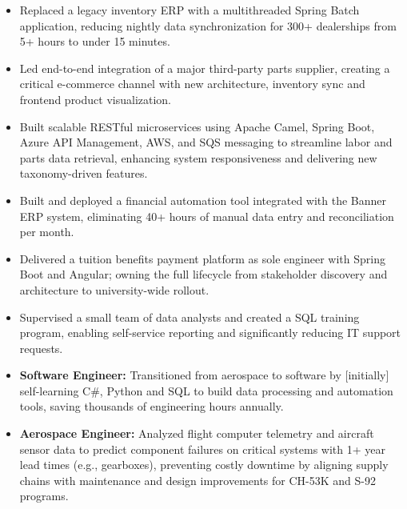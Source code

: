 \begin{itemize}[leftmargin=*, itemsep=\bulletItemSeparation, topsep=0pt]
    \item Replaced a legacy inventory ERP with a multithreaded Spring Batch application, reducing nightly data synchronization for 300+ dealerships from 5+ hours to under 15 minutes.
    \item Led end-to-end integration of a major third-party parts supplier, creating a critical e-commerce channel with new architecture, inventory sync and frontend product visualization.
    \item Built scalable RESTful microservices using Apache Camel, Spring Boot, Azure API Management, AWS, and SQS messaging to streamline labor and parts data retrieval, enhancing system responsiveness and delivering new taxonomy-driven features.
\end{itemize}
\vspace{\spacingBetweenJobs}

\begin{itemize}[leftmargin=*, itemsep=\bulletItemSeparation, topsep=0pt]
    \item Built and deployed a financial automation tool integrated with the Banner ERP system, eliminating 40+ hours of manual data entry and reconciliation per month.
    \item Delivered a tuition benefits payment platform as sole engineer with Spring Boot and Angular; owning the full lifecycle from stakeholder discovery and architecture to university-wide rollout.
    \item Supervised a small team of data analysts and created a SQL training program, enabling self-service reporting and significantly reducing IT support requests.
\end{itemize}
\vspace{\spacingBetweenJobs}

\begin{itemize}[leftmargin=*, itemsep=\bulletItemSeparation, topsep=0pt]
    \item \textbf{Software Engineer:} Transitioned from aerospace to software by [initially] self-learning C\#, Python and SQL to build data processing and automation tools, saving thousands of engineering hours annually.
    \item \textbf{Aerospace Engineer:} Analyzed flight computer telemetry and aircraft sensor data to predict component failures on critical systems with 1+ year lead times (e.g., gearboxes), preventing costly downtime by aligning supply chains with maintenance and design improvements for CH-53K and S-92 programs.
\end{itemize}
\vspace{\spacingBetweenJobs}

